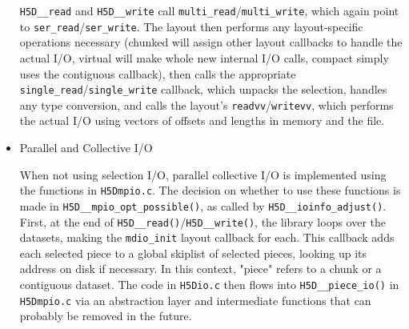 \begin{itemize}
\texttt{H5D\_\_read{}} and \texttt{H5D\_\_write} call \texttt{multi\_read}/\texttt{multi\_write}, which again point to \texttt{ser\_read}/\texttt{ser\_write}. The layout then performs any layout-specific operations necessary (chunked will assign other layout callbacks to handle the actual I/O, virtual will make whole new internal I/O calls, compact simply uses the contiguous callback), then calls the appropriate \texttt{single\_read}/\texttt{single\_write} callback, which unpacks the selection, handles any type conversion, and calls the layout's \texttt{readvv}/\texttt{writevv}, which performs the actual I/O using vectors of offsets and lengths in memory and the file.

    \item Parallel and Collective I/O

When not using selection I/O, parallel collective I/O is implemented using the functions in \texttt{H5Dmpio.c}. The decision on whether to use these functions is made in \texttt{H5D\_\_mpio\_opt\_possible()}, as called by \texttt{H5D\_\_ioinfo\_adjust()}. First, at the end of \texttt{H5D\_\_read()}/\texttt{H5D\_\_write()}, the library loops over the datasets, making the \texttt{mdio\_init} layout callback for each. This callback adds each selected piece to a global skiplist of selected pieces, looking up its address on disk if necessary. In this context, "piece" refers to a chunk or a contiguous dataset. The code in \texttt{H5Dio.c} then flows into \texttt{H5D\_\_piece\_io()} in \texttt{H5Dmpio.c} via an abstraction layer and intermediate functions that can probably be removed in the future.


\end{itemize}
